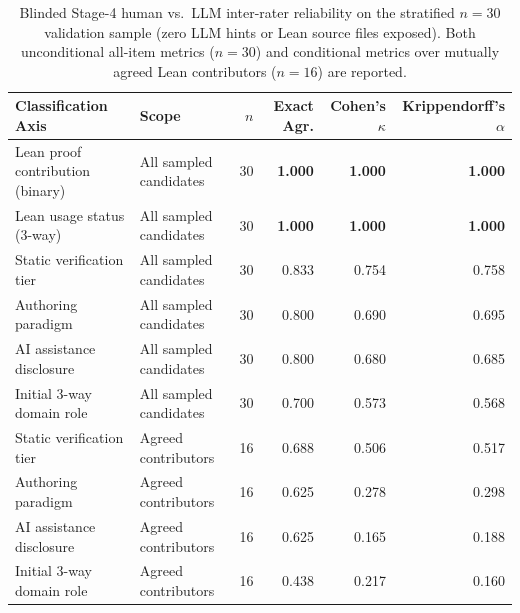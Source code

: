 \documentclass[11pt,letterpaper]{article}
\begin{document}
\begin{table}[t]
\centering
\caption{Blinded Stage-4 human vs.\ LLM inter-rater reliability on the stratified $n = 30$ validation sample (zero LLM hints or Lean source files exposed). Both unconditional all-item metrics ($n = 30$) and conditional metrics over mutually agreed Lean contributors ($n = 16$) are reported.}
\label{tab:stage4_irr}
\footnotesize
\setlength{\tabcolsep}{5pt}
\begin{tabular}{llrrrr}
\toprule
\textbf{Classification Axis} & \textbf{Scope} & \textbf{$n$} & \textbf{Exact Agr.} & \textbf{Cohen's $\kappa$} & \textbf{Krippendorff's $\alpha$} \\
\midrule
Lean proof contribution (binary) & All sampled candidates & 30 & \textbf{1.000} & \textbf{1.000} & \textbf{1.000} \\
Lean usage status (3-way) & All sampled candidates & 30 & \textbf{1.000} & \textbf{1.000} & \textbf{1.000} \\
\midrule
Static verification tier & All sampled candidates & 30 & 0.833 & 0.754 & 0.758 \\
Authoring paradigm & All sampled candidates & 30 & 0.800 & 0.690 & 0.695 \\
AI assistance disclosure & All sampled candidates & 30 & 0.800 & 0.680 & 0.685 \\
Initial 3-way domain role & All sampled candidates & 30 & 0.700 & 0.573 & 0.568 \\
\midrule
Static verification tier & Agreed contributors & 16 & 0.688 & 0.506 & 0.517 \\
Authoring paradigm & Agreed contributors & 16 & 0.625 & 0.278 & 0.298 \\
AI assistance disclosure & Agreed contributors & 16 & 0.625 & 0.165 & 0.188 \\
Initial 3-way domain role & Agreed contributors & 16 & 0.438 & 0.217 & 0.160 \\
\bottomrule
\end{tabular}
\end{table}
\end{document}
